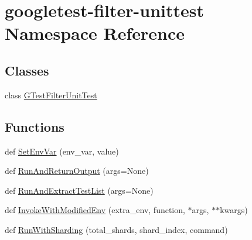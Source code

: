 \hypertarget{namespacegoogletest-filter-unittest}{}\section{googletest-\/filter-\/unittest Namespace Reference}
\label{namespacegoogletest-filter-unittest}
\subsection*{Classes}
\begin{DoxyCompactItemize}
\item 
class \mbox{\hyperlink{classgoogletest-filter-unittest_1_1GTestFilterUnitTest}{G\+Test\+Filter\+Unit\+Test}}
\end{DoxyCompactItemize}
\subsection*{Functions}
\begin{DoxyCompactItemize}
\item 
def \mbox{\hyperlink{namespacegoogletest-filter-unittest_a829bf5a2df452c96f0ad7a1f0d47401e}{Set\+Env\+Var}} (env\+\_\+var, value)
\item 
def \mbox{\hyperlink{namespacegoogletest-filter-unittest_a24bae2131f3ea9a470f76a090f704d23}{Run\+And\+Return\+Output}} (args=None)
\item 
def \mbox{\hyperlink{namespacegoogletest-filter-unittest_a400558042f3187a396a3dfe020423dfb}{Run\+And\+Extract\+Test\+List}} (args=None)
\item 
def \mbox{\hyperlink{namespacegoogletest-filter-unittest_aaad57c395db92d5b0cdd94a3af2359bf}{Invoke\+With\+Modified\+Env}} (extra\+\_\+env, function, $\ast$args, $\ast$$\ast$kwargs)
\item 
def \mbox{\hyperlink{namespacegoogletest-filter-unittest_a838960aa0f3d4cce4b0f76169929b94e}{Run\+With\+Sharding}} (total\+\_\+shards, shard\+\_\+index, command)
\end{DoxyCompactItemize}
